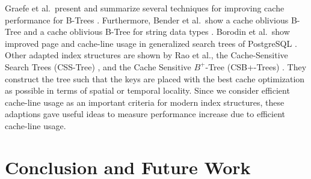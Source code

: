 \documentclass[runningheads,a4paper]{llncs}
\begin{document}
Graefe et al.\ present and summarize several techniques for improving cache performance for B-Trees \cite{graefe2001b}. Furthermore, Bender et al.\ show a cache oblivious B-Tree \cite{bender2000cache} and a cache oblivious B-Tree for string data types \cite{bender2006cache}. Borodin et al.\ show improved page and cache-line usage in generalized search trees of PostgreSQL \cite{borodin2017optimization}. Other adapted index structures are shown by Rao et al., the Cache-Sensitive Search Trees (CSS-Tree) \cite{rao1999cache}, and the Cache Sensitive $B^+$-Tree (CSB+-Trees) \cite{rao2000making}. They construct the tree such that the keys are placed with the best cache optimization as possible in terms of spatial or temporal locality. Since we consider efficient cache-line usage as an important criteria for modern index structures, these adaptions gave useful ideas to measure performance increase due to efficient cache-line usage. 




\section{Conclusion and Future Work}
\end{document}

